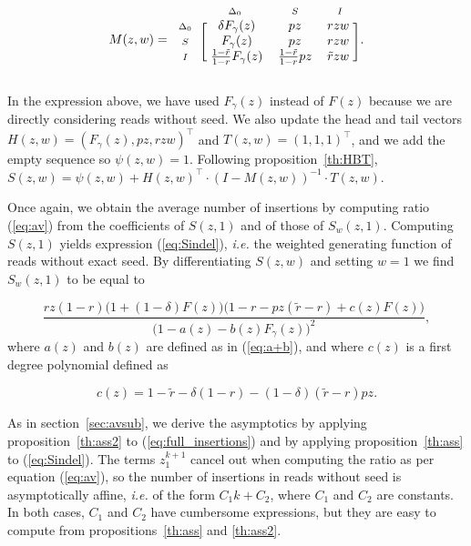 \documentclass{article}
\newcommand{\smI}{\scriptstyle{I}}
\newcommand{\smS}{\scriptstyle{S}}
\newcommand{\smDELz}{\scriptstyle{\Delta_0}}
\begin{document}
\begin{equation*}
M(z,w) = 
\begin{blockarray}{cccc}
       & \smDELz & \smS & \smI \\
\begin{block}{c[ccc]}
\smDELz & \; \delta F_\gamma(z) & pz & rzw \; \\
\smS    & \;        F_\gamma(z) & pz & rzw \; \\
\smI    & \; \frac{1-\tilde{r}}{1-r}F_\gamma(z)
           & \frac{1-\tilde{r}}{1-r}pz & \tilde{r}zw \; \\
\end{block}
\end{blockarray}.
\end{equation*}

In the expression above, we have used $F_\gamma(z)$ instead of $F(z)$
because we are directly considering reads without seed. We also update the
head and tail vectors $H(z,w) = (F_\gamma(z), pz, rzw)^\top$ and
$T(z,w)=(1,1,1)^\top$, and we add the empty sequence so $\psi(z,w) = 1$.
Following proposition~\ref{th:HBT}, $S(z,w) = \psi(z,w) + H(z,w)^\top
\cdot (I-M(z,w))^{-1} \cdot T(z,w)$.

Once again, we obtain the average number of insertions by computing ratio
(\ref{eq:av}) from the coefficients of $S(z,1)$ and of those of
$S_w(z,1)$. Computing $S(z,1)$ yields expression (\ref{eq:Sindel}),
\textit{i.e.} the weighted generating function of reads without exact
seed. By differentiating $S(z,w)$ and setting $w=1$ we find $S_w(z,1)$ to
be equal to

\begin{equation}
\label{eq:full_insertions}
\frac{rz(1-r)\big(1+(1-\delta)F(z)\big)\big(1-r-pz(\tilde{r}-r)
  +c(z)F(z) \big)}
  {\big(1-a(z)-b(z)F_\gamma(z)\big)^2},
\end{equation}
where $a(z)$ and $b(z)$ are defined as in (\ref{eq:a+b}), and where $c(z)$
is a first degree polynomial defined as

\begin{equation*}
c(z) = 1-\tilde{r}-\delta(1-r) - (1-\delta)(\tilde{r}-r)pz.
\end{equation*}

As in section~\ref{sec:avsub}, we derive the asymptotics by applying
proposition~\ref{th:ass2} to (\ref{eq:full_insertions}) and by applying
proposition~\ref{th:ass} to (\ref{eq:Sindel}). The terms $z_1^{k+1}$ cancel
out when computing the ratio as per equation (\ref{eq:av}), so the number
of insertions in reads without seed is asymptotically affine,
\textit{i.e.} of the form $C_1k+C_2$, where $C_1$ and $C_2$ are constants.
In both cases, $C_1$ and $C_2$ have cumbersome expressions, but they are
easy to compute from propositions~\ref{th:ass} and \ref{th:ass2}.
\end{document}
